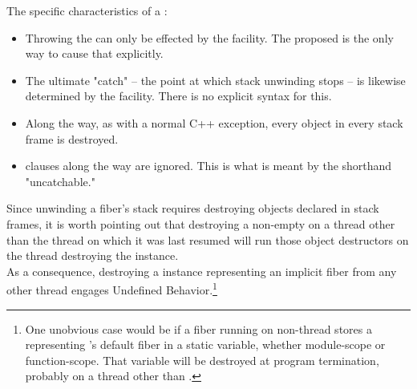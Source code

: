 The specific characteristics of a \foreignex:

\begin{itemize}
    \item Throwing the \foreignex can only be effected by the \fiber
    facility. The proposed \unwindfib is the only way to cause that
    explicitly.
    \item The ultimate "catch" -- the point at which stack unwinding stops --
    is likewise determined by the \fiber facility. There is no explicit syntax
    for this.
    \item Along the way, as with a normal C++ exception, every object in every
    stack frame is destroyed.
    \item {} clauses along the way are ignored. This is
    what is meant by the shorthand "uncatchable."
\end{itemize}

Since unwinding a fiber's stack requires destroying objects declared in stack
frames,
it is worth pointing out that destroying a non-empty \fiber on a thread other
than the thread on which it was last resumed will run those object destructors
on the thread destroying the \fiber instance.\\

As a consequence, destroying a \fiber instance representing an implicit fiber
from any other thread engages Undefined Behavior.\footnote{One unobvious case
would be if a fiber running on non-\main thread  stores a \fiber
representing 's default fiber in a static variable, whether
module-scope or function-scope. That variable will be destroyed at program
termination, probably on a thread other than .}\\

